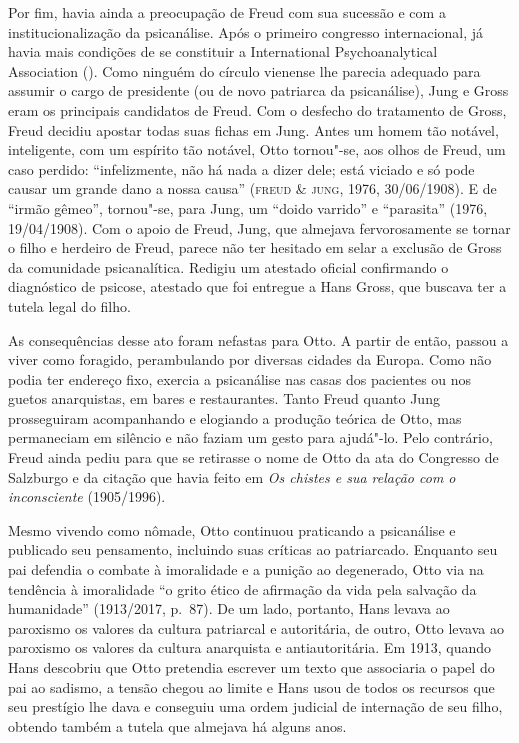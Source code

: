 Por fim, havia ainda a preocupação de Freud com sua sucessão e com a
institucionalização da psicanálise. Após o primeiro congresso
internacional, já havia mais condições de se constituir a International
Psychoanalytical Association (). Como ninguém do círculo vienense lhe
parecia adequado para assumir o cargo de presidente (ou de novo
patriarca da psicanálise), Jung e Gross eram os principais candidatos de
Freud. Com o desfecho do tratamento de Gross, Freud decidiu apostar
todas suas fichas em Jung. Antes um homem tão notável, inteligente, com
um espírito tão notável, Otto tornou"-se, aos olhos de Freud, um caso
perdido: ``infelizmente, não há nada a dizer dele; está viciado e só
pode causar um grande dano a nossa causa'' (\textsc{freud} \& \textsc{jung}, 1976,
30/06/1908). E de ``irmão gêmeo'', tornou"-se, para Jung, um ``doido
varrido'' e ``parasita'' (1976, 19/04/1908). Com o apoio de
Freud, Jung, que almejava fervorosamente se tornar o filho e herdeiro de
Freud, parece não ter hesitado em selar a exclusão de Gross da
comunidade psicanalítica. Redigiu um atestado oficial confirmando o
diagnóstico de psicose, atestado que foi entregue a Hans Gross, que
buscava ter a tutela legal do filho.

As consequências desse ato foram nefastas para Otto. A partir de então,
passou a viver como foragido, perambulando por diversas cidades da
Europa. Como não podia ter endereço fixo, exercia a psicanálise nas
casas dos pacientes ou nos guetos anarquistas, em bares e restaurantes.
Tanto Freud quanto Jung prosseguiram acompanhando e elogiando a produção
teórica de Otto, mas permaneciam em silêncio e não faziam um gesto para
ajudá"-lo. Pelo contrário, Freud ainda pediu para que se retirasse o nome
de Otto da ata do Congresso de Salzburgo e da citação que havia feito em
\emph{Os chistes e sua relação com o inconsciente} (1905/1996).

Mesmo vivendo como nômade, Otto continuou praticando a psicanálise e
publicado seu pensamento, incluindo suas críticas ao patriarcado.
Enquanto seu pai defendia o combate à imoralidade e a punição ao
degenerado, Otto via na tendência à imoralidade ``o grito ético de
afirmação da vida pela salvação da humanidade'' (1913/2017, p.~87). De um lado, portanto,
Hans levava ao paroxismo os valores da cultura patriarcal e autoritária,
de outro, Otto levava ao paroxismo os valores da cultura anarquista e
antiautoritária. Em 1913, quando Hans descobriu que Otto pretendia
escrever um texto que associaria o papel do pai ao sadismo, a tensão
chegou ao limite e Hans usou de todos os recursos que seu prestígio lhe
dava e conseguiu uma ordem judicial de internação de seu filho, obtendo
também a tutela que almejava há alguns anos.

